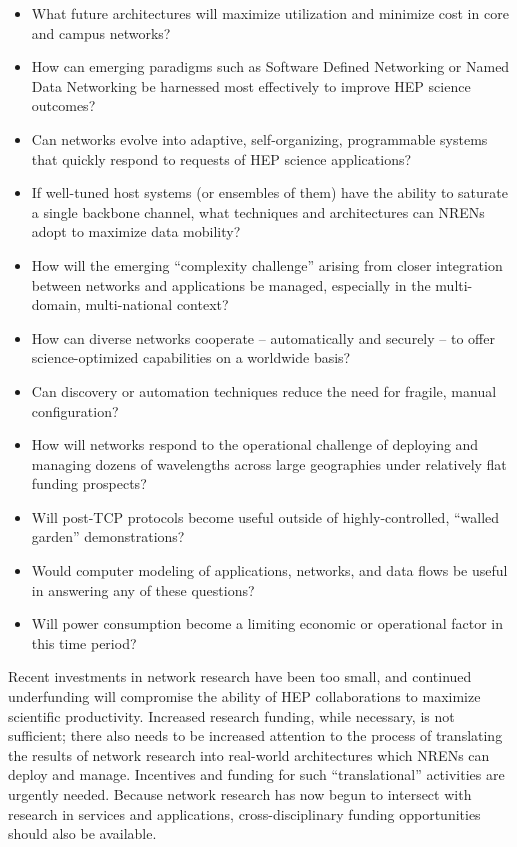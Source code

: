 \begin{itemize}
\item What future architectures will maximize utilization and minimize cost in core and campus networks?
\item How can emerging paradigms such as Software Defined Networking or Named Data Networking be harnessed most effectively to improve HEP science outcomes?
\item Can networks evolve into adaptive, self-organizing, programmable systems that quickly respond to requests of HEP science applications? 
\item If well-tuned host systems (or ensembles of them) have the ability to saturate a single backbone channel, what techniques and architectures can NRENs adopt to maximize data mobility?
\item How will the emerging “complexity challenge” arising from closer integration between networks and applications be managed, especially in the multi-domain, multi-national context?
\item How can diverse networks cooperate – automatically and securely – to offer science-optimized capabilities on a worldwide basis? 
\item Can discovery or automation techniques reduce the need for fragile, manual configuration? 
\item How will networks respond to the operational challenge of deploying  and managing dozens of wavelengths across large geographies under relatively flat funding prospects? 
\item Will post-TCP protocols become useful outside of highly-controlled, “walled garden” demonstrations? 
\item Would computer modeling of applications, networks, and data flows be useful in answering any of these questions?  
\item Will power consumption become a limiting economic or operational factor in this time period? 
\end{itemize}

Recent investments in network research have been too small, and continued underfunding will compromise the ability of HEP collaborations to maximize scientific productivity. Increased research funding, while necessary, is not sufficient; there also needs to be increased attention to the process of translating the results of network research into real-world architectures which NRENs can deploy and manage. Incentives and funding for such ``translational'' activities are urgently needed. Because network research has now begun to intersect with research in services and applications, cross-disciplinary funding opportunities should also be available.  

